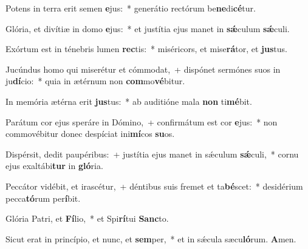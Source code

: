 \item Potens in terra erit semen \textbf{e}jus:~* generátio rectórum be\textbf{ne}di\textbf{cé}tur.

\item Glória, et divítiæ in domo \textbf{e}jus:~* et justítia ejus manet in \textbf{sǽ}culum \textbf{sǽ}culi.

\item Exórtum est in ténebris lumen \textbf{rec}tis:~* miséricors, et mise\textbf{rá}tor, et \textbf{jus}tus.

\item Jucúndus homo qui miserétur et cómmodat,~+ dispónet sermónes suos in ju\textbf{dí}cio:~* quia in ætérnum non \textbf{com}mo\textbf{vé}bitur.

\item In memória ætérna erit \textbf{jus}tus:~* ab auditióne mala \textbf{non} ti\textbf{mé}bit.

\item Parátum cor ejus speráre in Dómino,~+ confirmátum est cor \textbf{e}jus:~* non commovébitur donec despíciat ini\textbf{mí}cos \textbf{su}os.

\item Dispérsit, dedit paupéribus:~+ justítia ejus manet in sǽculum \textbf{sǽ}culi,~* cornu ejus exaltábi\textbf{tur} in \textbf{gló}ria.

\item Peccátor vidébit, et irascétur,~+ déntibus suis fremet et ta\textbf{bé}scet:~* desidérium pecca\textbf{tó}rum per\textbf{í}bit.

\item Glória Patri, et \textbf{Fí}lio,~* et Spi\textbf{rí}tui \textbf{Sanc}to.

\item Sicut erat in princípio, et nunc, et \textbf{sem}per,~* et in sǽcula sæcu\textbf{ló}rum. \textbf{A}men.
